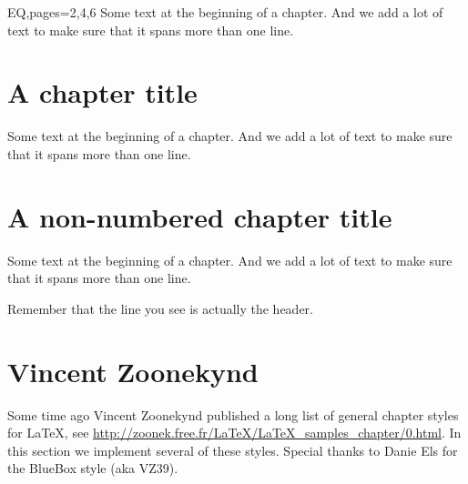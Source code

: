 \begin{showchapterstyle*}{EQ,pages={2,4,6}}
Some text at the beginning of a chapter. And we add a lot of text to
make sure that it spans more than one line.

\mainmatter

\chapter{A chapter title}
Some text at the beginning of a chapter. And we add a lot of text to
make sure that it spans more than one line.

\chapter*{A non-numbered chapter title}
Some text at the beginning of a chapter. And we add a lot of text to
make sure that it spans more than one line.


\end{showchapterstyle*}
Remember that the line you see is actually the header.


\newpage

\chapter{Vincent Zoonekynd}
\label{sec:vincent-zoonekynd}

Some time ago Vincent Zoonekynd published a long list of general
chapter styles for \LaTeX, see
\url{http://zoonek.free.fr/LaTeX/LaTeX_samples_chapter/0.html}. 
In this section we implement several of these styles. Special thanks
to Danie Els for the BlueBox style (aka VZ39).

